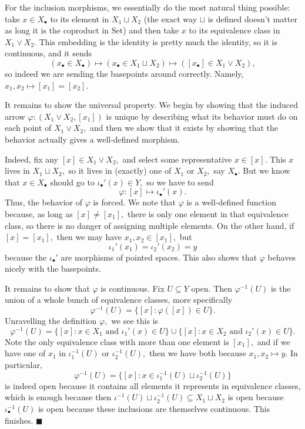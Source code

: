 For the inclusion morphisms, we essentially do the most natural thing possible: take $x\in X_\bullet$ to its element in $X_1\sqcup X_2$ (the exact way $\sqcup$ is defined doesn't matter as long it is the coproduct in $\text{Set}$) and then take $x$ to its equivalence class in $X_1\vee X_2.$ This embedding is the identity is pretty much the identity, so it is continuous, and it sends
\[(x_\bullet\in X_\bullet)\longmapsto(x_\bullet\in X_1\sqcup X_2)\longmapsto([x_\bullet]\in X_1\vee X_2),\]
so indeed we are sending the basepoints around correctly. Namely, $x_1,x_2\mapsto[x_1]=[x_2].$

It remains to show the universal property. We begin by showing that the induced arrow $\varphi:(X_1\vee X_2,[x_1])$ is unique by describing what its behavior must do on each point of $X_1\vee X_2,$ and then we show that it exists by showing that the behavior actually gives a well-defined morphism.

Indeed, fix any $[x]\in X_1\vee X_2,$ and select some representative $x\in[x].$ This $x$ lives in $X_1\sqcup X_2,$ so it lives in (exactly) one of $X_1$ or $X_2,$ say $X_\bullet.$ But we know that $x\in X_\bullet$ should go to $\iota_\bullet'(x)\in Y,$ so we have to send
\[\varphi:[x]\mapsto\iota_\bullet'(x).\]
Thus, the behavior of $\varphi$ is forced. We note that $\varphi$ is a well-defined function because, as long as $[x]\ne[x_1],$ there is only one element in that equivalence class, so there is no danger of assigning multiple elements. On the other hand, if $[x]=[x_1],$ then we may have $x_1,x_2\in[x_1],$ but
\[\iota_1'(x_1)=\iota_2'(x_2)=y\]
because the $\iota_\bullet'$ are morphisms of pointed spaces. This also shows that $\varphi$ behaves nicely with the basepoints.

It remains to show that $\varphi$ is continuous. Fix $U\subseteq Y$ open. Then $\varphi^{-1}(U)$ is the union of a whole bunch of equivalence classes, more specifically
\[\varphi^{-1}(U)=\{[x]:\varphi([x])\in U\}.\]
Unravelling the definition $\varphi,$ we see this is
\[\varphi^{-1}(U)=\{[x]:x\in X_1\text{ and }\iota_1'(x)\in U\}\cup\{[x]:x\in X_2\text{ and }\iota_2'(x)\in U\}.\]
Note the only equivalence class with more than one element is $[x_1],$ and if we have one of $x_1$ in $\iota_1^{-1}(U)$ or $\iota_2^{-1}(U),$ then we have both because $x_1,x_2\mapsto y.$ In particular,
\[\varphi^{-1}(U)=\{[x]:x\in\iota_1^{-1}(U)\sqcup\iota_2^{-1}(U)\}\]
is indeed open because it contains all elements it represents in equivalence classes, which is enough because then $\iota^{-1}(U)\sqcup\iota_2^{-1}(U)\subseteq X_1\sqcup X_2$ is open because $\iota_\bullet^{-1}(U)$ is open because these inclusions are themselves continuous. This finishes. $\blacksquare$

